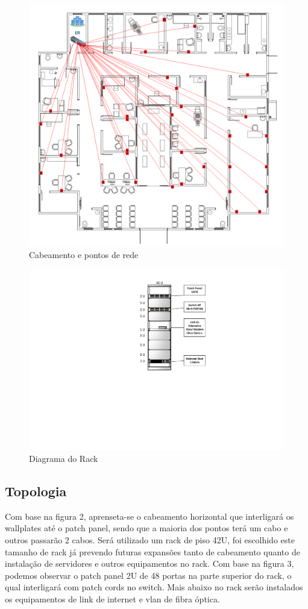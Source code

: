 \documentclass[	DIV=calc,%
							paper=a4,%
							fontsize=12pt,%
							onecolumn]{scrartcl}	 					%
\begin{document}
\begin{figure}
	\centering
	\includegraphics[width=\textwidth]{fig2}
	\caption{Cabeamento e pontos de rede}
	\label{fig2}
\end{figure}

\begin{figure}
	\centering
	\includegraphics[width=\textwidth]{fig3}
	\caption{Diagrama do Rack}
	\label{fig3}
\end{figure}

\subsection{Topologia}
Com base na figura 2, aprenseta-se o cabeamento horizontal que interligará os wallplates até o patch panel, sendo que a maioria dos pontos terá um cabo e outros passarão 2 cabos. Será utilizado um rack de piso 42U, foi escolhido este tamanho de rack já prevendo futuras expansões tanto de cabeamento quanto de instalação de servidores e outros equipamentos no rack. Com base na figura 3, podemos observar o patch panel 2U de 48 portas na parte superior do rack, o qual interligará com patch cords no switch. Mais abaixo no rack serão instalados os equipamentos de link de internet e vlan de fibra óptica. 
\end{document}

